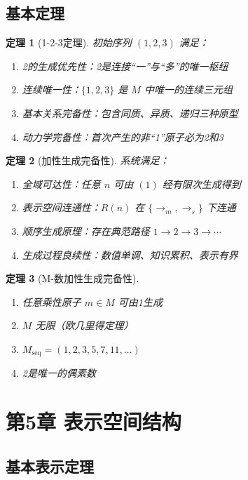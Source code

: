 \documentclass[12pt]{article}
\newtheorem{theorem}{定理}[section]
\theoremstyle{definition}
\begin{document}
\subsection{基本定理}

\begin{theorem}[1-2-3定理]
初始序列 \((1,2,3)\) 满足：
\begin{enumerate}
    \item 2的生成优先性：2是连接“一”与“多”的唯一枢纽
    \item 连续唯一性：\(\{1,2,3\}\) 是 \(M\) 中唯一的连续三元组
    \item 基本关系完备性：包含同质、异质、递归三种原型
    \item 动力学完备性：首次产生的非“1”原子必为2和3
\end{enumerate}
\end{theorem}

\begin{theorem}[加性生成完备性]
系统满足：
\begin{enumerate}
    \item 全域可达性：任意 \(n\) 可由 \((1)\) 经有限次生成得到
    \item 表示空间连通性：\(R(n)\) 在 \(\{\rightarrow_m, \rightarrow_s\}\) 下连通
    \item 顺序生成原理：存在典范路径 \(1 \rightarrow 2 \rightarrow 3 \rightarrow \cdots\)
    \item 生成过程良续性：数值单调、知识累积、表示有界
\end{enumerate}
\end{theorem}

\begin{theorem}[M-数加性生成完备性]
\begin{enumerate}
    \item 任意乘性原子 \(m \in M\) 可由1生成
    \item \(M\) 无限（欧几里得定理）
    \item \(M_{\text{seq}} = (1,2,3,5,7,11,\dots)\)
    \item 2是唯一的偶素数
\end{enumerate}
\end{theorem}

\section{第5章 表示空间结构}

\subsection{基本表示定理}
\end{document}
